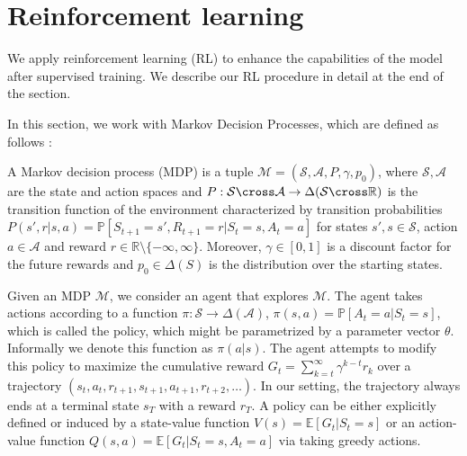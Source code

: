 \section{Reinforcement learning}
\label{sec:reinforcement learning}

We apply reinforcement learning (RL) to enhance the capabilities of the model after supervised training. We describe our RL procedure in detail at the end of the section.

In this section, we work with Markov Decision Processes, which are defined as follows \cite{SuttonAndBarto2018,lehmann2024definitiveguidepolicygradients}:

\begin{definition}
    A Markov decision process (MDP) is a tuple $\mathcal{M} = (\mathcal{S}, \mathcal{A}, P, \gamma, p_0)$, where $\mathcal{S}, \mathcal{A}$ are the state and action spaces and $P:\mathcal{S}\cross\mathcal{A}\rightarrow\Delta(\mathcal{S}\cross\mathbb{R})$ is the transition function of the environment characterized by transition probabilities $P(s', r | s, a) = \mathbb{P}[S_{t + 1} = s', R_{t + 1} = r | S_t = s, A_t = a]$ for states $s', s\in\mathcal{S}$,  action $a\in\mathcal{A}$ and reward $r\in\mathbb{R}\setminus\{-\infty, \infty\}$. Moreover, $\gamma\in[0, 1]$ is a discount factor for the future rewards and $p_0\in\Delta(S)$ is the distribution over the starting states.
\end{definition}


Given an MDP $\mathcal{M}$, we consider an agent that explores $\mathcal{M}$. The agent takes actions according to a function $\pi:\mathcal{S}\rightarrow\Delta(\mathcal{A})$, $\pi(s, a) = \mathbb{P}[A_t = a | S_t = s]$, which is called the policy, which might be parametrized by a parameter vector $\theta$. Informally we denote this function as $\pi(a | s)$. The agent attempts to modify this policy to maximize the cumulative reward $G_t = \sum_{k=t}^{\infty} \gamma^{k - t} r_k$ over a trajectory $(s_t, a_t, r_{t+1}, s_{t+1}, a_{t+1}, r_{t+2}, \dots)$. In our setting, the trajectory always ends at a terminal state $s_T$ with a reward $r_T$. A policy can be either explicitly defined or induced by a state-value function $V(s) = \mathbb{E}[G_t | S_t = s]$ or an action-value function $Q(s, a) = \mathbb{E}[G_t | S_t = s, A_t = a]$ \cite{SuttonAndBarto2018} via taking greedy actions.



